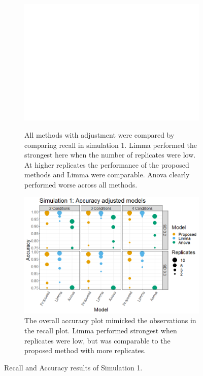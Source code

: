\documentclass{mcp}
\begin{document}
\begin{figure}[h!]
\centering
 \begin{subfigure}{\textwidth}
  \centering
	\includegraphics[width=.8\textwidth]{sim_new/sim1_Recall}\\
	\caption{All methods with adjustment were compared by comparing recall in simulation 1. Limma performed the strongest here when the number of replicates were low. At higher replicates the performance of the proposed methods and Limma were comparable. Anova clearly performed worse across all methods.}
 \end{subfigure}
 \begin{subfigure}{\textwidth}
  \centering
	\includegraphics[width=.8\textwidth]{sim_new/sim1_accuracy}
	\caption{The overall accuracy plot mimicked the observations in the recall plot. Limma performed strongest when replicates were low, but was comparable to the proposed method with more replicates.}
 \end{subfigure}
\caption{Recall and Accuracy results of Simulation 1.}
\label{fig:sim1_recall}
\end{figure}
\end{document}
